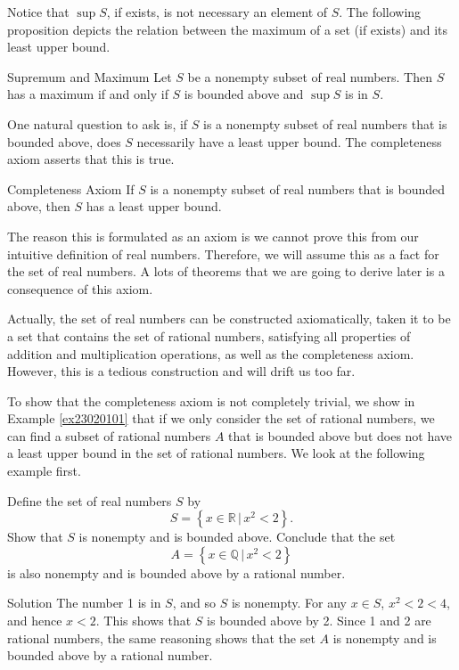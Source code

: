 Notice that $\sup S$, if exists, is not necessary an element of $S$.  The following proposition depicts the relation between the maximum of a set (if exists) and its least upper bound.
\begin{proposition}[label=23020606]{Supremum and Maximum}
Let $S$ be a nonempty subset of real numbers. Then $S$ has a maximum if and only if $S$ is bounded above and $\sup S$ is in $S$.
\end{proposition}

One natural question to ask is, if $S$ is a nonempty subset of real numbers that is bounded above, does $S$ necessarily have a least upper bound. The completeness axiom   asserts that this is true.
\begin{highlight}{Completeness Axiom}
If $S$  is a nonempty subset of real numbers that is bounded above, then $S$ has a least upper bound.
\end{highlight}

The reason this is formulated as an axiom is we cannot prove this   from our intuitive definition of real numbers. Therefore, we will assume this as a fact for the set of real numbers. A lots of theorems that we  are going to derive later is a consequence of this axiom. 

Actually, the set of real numbers can be constructed axiomatically, taken it to be a set that contains the set of rational numbers, satisfying all properties of addition and multiplication operations, as well as   the completeness axiom. However, this is a tedious construction and will drift us too far. 

 To show that the completeness axiom is not completely trivial, we  show in Example \ref{ex23020101} that if we only consider the set of rational numbers, we can find a subset of rational numbers $A$ that is bounded above but does not   have a least upper bound in the set of rational numbers. We look at the following example first.


\begin{example}[label=23020701]{}
Define the set of real numbers $S$ by
\[S=\left\{x\in \mathbb{R}\,|\, x^2<2\right\}.\]
Show that $S$ is nonempty and is bounded above. Conclude that the set 
\[A=\left\{x\in \mathbb{Q}\,|\, x^2<2\right\}\] is also nonempty and is bounded above by a rational number.
\end{example}

\begin{solution}{Solution}
 The number 1 is  in $S$, and so $S$ is nonempty.
For any $x\in S$, 
$x^2<2<4$, and hence
$x<2$.
This shows that $S$ is bounded above by 2.  
Since 1 and 2 are rational numbers, the same reasoning shows that the set $A$ is nonempty and is bounded above by a rational number.
\end{solution}
 
